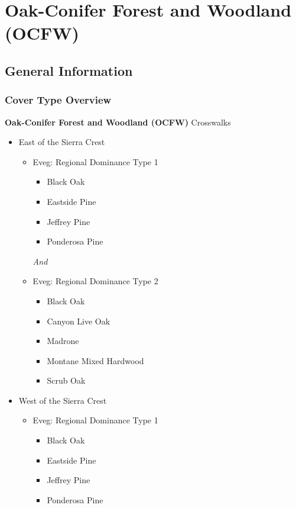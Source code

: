 \newpage
\section{Oak-Conifer Forest and Woodland (OCFW)}

\subsection*{General Information}

\subsubsection{Cover Type Overview}

\textbf{Oak-Conifer Forest and Woodland (OCFW)}
\newline
Crosswalks
\begin{itemize}
	\item East of the Sierra Crest
	\begin{itemize}
		\item Eveg: Regional Dominance Type 1
		\begin{itemize}
			\item Black Oak
			\item Eastside Pine
			\item Jeffrey Pine
			\item Ponderosa Pine
		\end{itemize}
		\emph{And}
		\item Eveg: Regional Dominance Type 2
		\begin{itemize}
			\item Black Oak
			\item Canyon Live Oak
			\item Madrone
			\item Montane Mixed Hardwood
			\item Scrub Oak
		\end{itemize}
	\end{itemize}

	\item West of the Sierra Crest
	\begin{itemize}
		\item Eveg: Regional Dominance Type 1
		\begin{itemize}
			\item Black Oak
			\item Eastside Pine
			\item Jeffrey Pine
			\item Ponderosa Pine
		\end{itemize}


\end{itemize}
\end{itemize}
